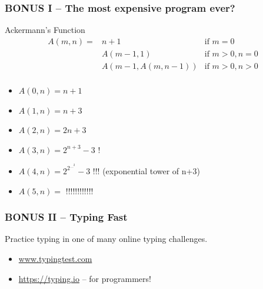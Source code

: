 \documentclass{beamer}
\begin{document}
\begin{frame}
  \frametitle{BONUS I -- The most expensive program ever?}

  \begin{block}{Ackermann's Function}
    \begin{eqnarray*}
      A(m,n) = & n+1 & \text{if } m = 0\\
      & A(m-1,1) & \text{if } m > 0, n = 0\\
      & A(m-1,A(m,n-1)) & \text{if } m > 0, n > 0\\
    \end{eqnarray*}
  \end{block}
  
  \begin{itemize}
    \item $A(0,n) = n+1$
    \item $A(1,n) = n+3$
    \item $A(2,n) = 2n+3$
    \item $A(3,n) = 2^{n+3}-3$ \alert{!}
    \item $A(4,n) = 2^{2^{...^2}}-3$ \alert{!!!} (exponential tower of n+3)
    \item $A(5,n) = $ \alert{!!!!!!!!!!!!}
  \end{itemize}
\end{frame}

\begin{frame}
  \frametitle{BONUS II -- Typing Fast}  

  Practice typing in one of many online typing challenges.
  \begin{itemize}
  \item \url{www.typingtest.com}
  \item \url{https://typing.io} -- for programmers!
  \end{itemize}    
\end{frame}



\end{document}
